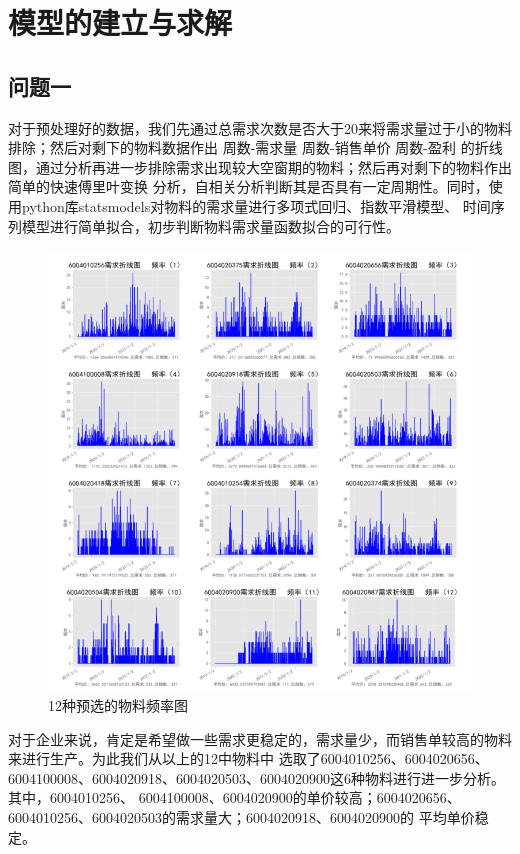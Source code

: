 \documentclass{cumcmthesis}
\begin{document}
        \section{模型的建立与求解}
        \subsection{问题一}
        对于预处理好的数据，我们先通过总需求次数是否大于20来将需求量过于小的物料排除；然后对剩下的物料数据作出 周数-需求量
         周数-销售单价 周数-盈利 的折线图，通过分析再进一步排除需求出现较大空窗期的物料；然后再对剩下的物料作出简单的快速傅里叶变换
        分析，自相关分析判断其是否具有一定周期性。同时，使用python库statsmodels对物料的需求量进行多项式回归、指数平滑模型、
        时间序列模型进行简单拟合，初步判断物料需求量函数拟合的可行性。\\

        \begin{figure}[ht]
            \centering
            \includegraphics[width=\textwidth]{graph/graph_1.png}
            \caption{12种预选的物料频率图}
            \label{fig:1}
        \end{figure}

        对于企业来说，肯定是希望做一些需求更稳定的，需求量少，而销售单较高的物料来进行生产。为此我们从以上的12中物料中
        选取了6004010256、6004020656、6004100008、6004020918、6004020503、6004020900这6种物料进行进一步分析。\\其中，6004010256、
        6004100008、6004020900的单价较高；6004020656、6004010256、6004020503的需求量大；6004020918、6004020900的
        平均单价稳定。
\end{document}
